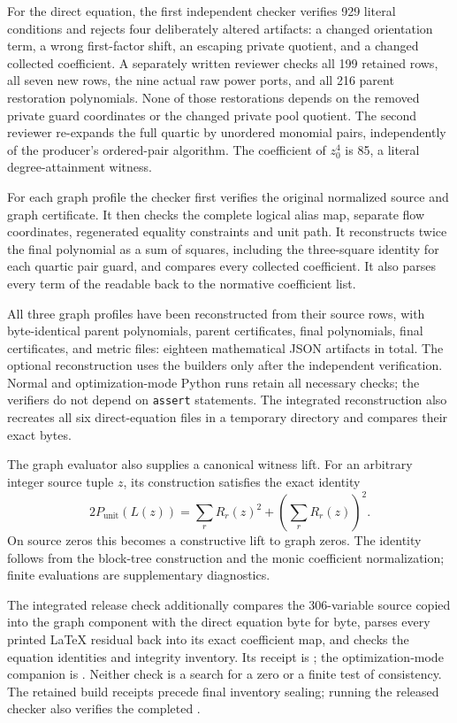For the direct equation, the first independent checker verifies 929 literal
conditions and rejects four deliberately altered artifacts: a changed
orientation term, a wrong first-factor shift, an escaping private quotient,
and a changed collected coefficient. A separately written reviewer checks
all 199 retained rows, all seven new rows, the nine actual raw power ports,
and all 216 parent restoration polynomials. None of those restorations
depends on the removed private guard coordinates or the changed private
pool quotient. The second reviewer re-expands the full quartic by unordered
monomial pairs, independently of the producer's ordered-pair algorithm.
The coefficient of $z_0^4$ is 85, a literal degree-attainment witness.

For each graph profile the checker first verifies the original normalized
source and graph certificate. It then checks the complete logical alias
map, separate flow coordinates, regenerated equality constraints and unit
path. It reconstructs twice the final polynomial as a sum of squares,
including the three-square identity for each quartic pair guard, and
compares every collected coefficient. It also parses every term of the
readable  back to the normative coefficient list.

All three graph profiles have been reconstructed from their source rows,
with byte-identical parent polynomials, parent certificates, final
polynomials, final certificates, and metric files: eighteen mathematical
JSON artifacts in total. The optional reconstruction uses the builders only
after the independent verification. Normal and optimization-mode Python
runs retain all necessary checks; the verifiers do not depend on
\texttt{assert} statements.
The integrated reconstruction also recreates all six direct-equation files
in a temporary directory and compares their exact bytes.

The graph evaluator also supplies a canonical witness lift. For an arbitrary
integer source tuple $z$, its construction satisfies the exact identity
\[
 2P_{\mathrm{unit}}(L(z))
   =\sum_rR_r(z)^2+\left(\sum_rR_r(z)\right)^2.
\]
On source zeros this becomes a constructive lift to graph zeros. The
identity follows from the block-tree construction and the monic coefficient
normalization; finite evaluations are supplementary diagnostics.

The integrated release check additionally compares the 306-variable source
copied into the graph component with the direct equation byte for byte,
parses every printed LaTeX residual back into its exact coefficient map,
and checks the equation identities and integrity inventory. Its receipt is
; the optimization-mode companion is
. Neither check is a search
for a zero or a finite test of consistency.
The retained build receipts precede final inventory sealing; running the
released checker also verifies the completed .
